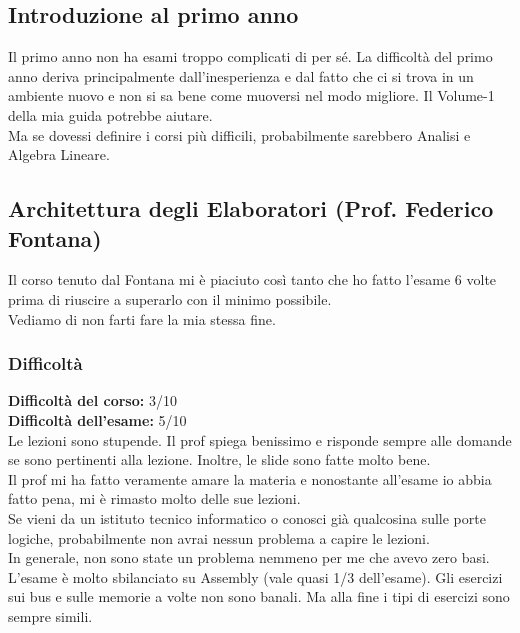\documentclass[18pt]{extarticle}
\begin{document}
\subsection{Introduzione al primo anno}
Il primo anno non ha esami troppo complicati di per sé. La difficoltà del primo anno deriva principalmente dall'inesperienza e dal fatto che ci si trova in un ambiente nuovo e non si sa bene come muoversi nel modo migliore. Il Volume-1 della mia guida potrebbe aiutare.\\
Ma se dovessi definire i corsi più difficili, probabilmente sarebbero Analisi e Algebra Lineare.\\



\subsection{Architettura degli Elaboratori (Prof. Federico Fontana)}
Il corso tenuto dal Fontana mi è piaciuto così tanto che ho fatto l'esame 6 volte prima di riuscire a superarlo con il minimo possibile.\\
Vediamo di non farti fare la mia stessa fine.\\

\subsubsection{Difficoltà}
\textbf{Difficoltà del corso:} 3/10\\
\textbf{Difficoltà dell'esame:} 5/10\\
Le lezioni sono stupende. Il prof spiega benissimo e risponde sempre alle domande se sono pertinenti alla lezione. 
Inoltre, le slide sono fatte molto bene.\\
Il prof mi ha fatto veramente amare la materia e nonostante all'esame io abbia fatto pena, mi è rimasto molto delle sue lezioni.\\
Se vieni da un istituto tecnico informatico o conosci già qualcosina sulle porte logiche, probabilmente non avrai nessun problema a capire le lezioni.\\
In generale, non sono state un problema nemmeno per me che avevo zero basi.\\
L'esame è molto sbilanciato su Assembly (vale quasi 1/3 dell'esame). Gli esercizi sui bus e sulle memorie a volte non sono banali. Ma alla fine i tipi di esercizi sono sempre simili.\\
\end{document}
